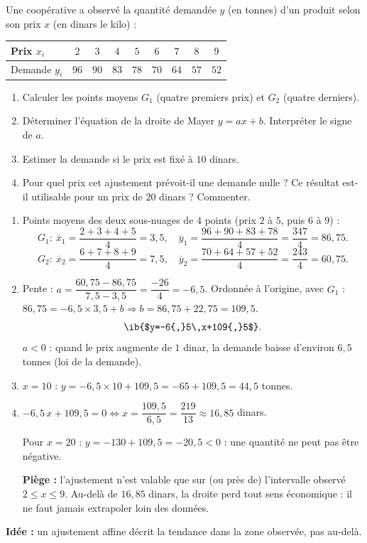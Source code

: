 
Une coopérative a observé la quantité demandée $y$ (en tonnes) d'un produit selon son prix $x$ (en dinars le kilo) :

\begin{center}
\begin{tabular}{|l|c|c|c|c|c|c|c|c|}
\hline
Prix $x_i$ & $2$ & $3$ & $4$ & $5$ & $6$ & $7$ & $8$ & $9$ \\ \hline
Demande $y_i$ & $96$ & $90$ & $83$ & $78$ & $70$ & $64$ & $57$ & $52$ \\ \hline
\end{tabular}
\end{center}

\begin{enumerate}
  \item Calculer les points moyens $G_1$ (quatre premiers prix) et $G_2$ (quatre derniers).
  \item Déterminer l'équation de la droite de Mayer $y=ax+b$. Interpréter le signe de $a$.
  \item Estimer la demande si le prix est fixé à $10$ dinars.
  \item Pour quel prix cet ajustement prévoit-il une demande nulle ? Ce résultat est-il utilisable pour un prix de $20$ dinars ? Commenter.
\end{enumerate}

\begin{enumerate}
  \item Points moyens des deux sous-nuages de $4$ points (prix $2$ à $5$, puis $6$ à $9$) :
  $$G_1:\ \overline{x}_1=\frac{2+3+4+5}4=3{,}5,\quad\overline{y}_1=\frac{96+90+83+78}4=\frac{347}4=86{,}75.$$
  $$G_2:\ \overline{x}_2=\frac{6+7+8+9}4=7{,}5,\quad\overline{y}_2=\frac{70+64+57+52}4=\frac{243}4=60{,}75.$$
  \item Pente : $a=\dfrac{60{,}75-86{,}75}{7{,}5-3{,}5}=\dfrac{-26}4=-6{,}5$. Ordonnée à l'origine, avec $G_1$ : $86{,}75=-6{,}5\times3{,}5+b\Rightarrow b=86{,}75+22{,}75=109{,}5$.
  $$ \ib{$y=-6{,}5\,x+109{,}5$}.$$
  $a<0$ : quand le prix augmente de $1$ dinar, la demande baisse d'environ $6{,}5$ tonnes (loi de la demande).
  \item $x=10$ : $y=-6{,}5\times10+109{,}5=-65+109{,}5=44{,}5$ tonnes.
  \item $-6{,}5\,x+109{,}5=0\iff x=\dfrac{109{,}5}{6{,}5}=\dfrac{219}{13}\approx16{,}85$ dinars.

  Pour $x=20$ : $y=-130+109{,}5=-20{,}5<0$ : une quantité ne peut pas être négative.

  \textbf{Piège :} l'ajustement n'est valable que sur (ou près de) l'intervalle observé $2\le x\le9$. Au-delà de $16{,}85$ dinars, la droite perd tout sens économique : il ne faut jamais extrapoler loin des données.
\end{enumerate}

\textbf{Idée :} un ajustement affine décrit la tendance dans la zone observée, pas au-delà.
